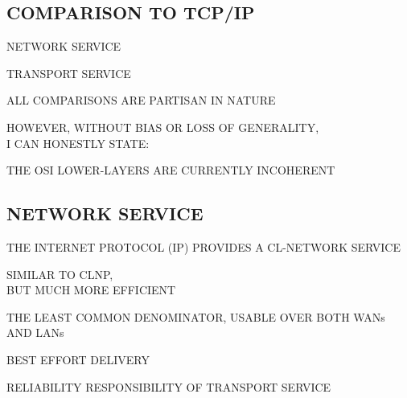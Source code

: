 

\begin{bwslide}
\part	{COMPARISON TO TCP/IP}\bf

\begin{nrtc}
\item	NETWORK SERVICE

\item	TRANSPORT SERVICE
\end{nrtc}
\end{bwslide}


\begin{bwslide}

\begin{nrtc}
\item	ALL COMPARISONS ARE PARTISAN IN NATURE

\item	HOWEVER, WITHOUT BIAS OR LOSS OF GENERALITY,\\ I CAN HONESTLY STATE:
    \begin{nrtc}
    \item	THE OSI LOWER-LAYERS ARE CURRENTLY INCOHERENT
    \end{nrtc}
\end{nrtc}
\end{bwslide}


\begin{bwslide}
\part*	{NETWORK SERVICE}\bf

\begin{nrtc}
\item	THE INTERNET PROTOCOL (IP) PROVIDES A CL-NETWORK SERVICE
    \begin{nrtc}
    \item	SIMILAR TO CLNP,\\ BUT MUCH MORE EFFICIENT
    \end{nrtc}

\item	THE LEAST COMMON DENOMINATOR, USABLE OVER BOTH WANs AND LANs
    \begin{nrtc}
    \item	BEST EFFORT DELIVERY

    \item	RELIABILITY RESPONSIBILITY OF TRANSPORT SERVICE
    \end{nrtc}
\end{nrtc}
\end{bwslide}


